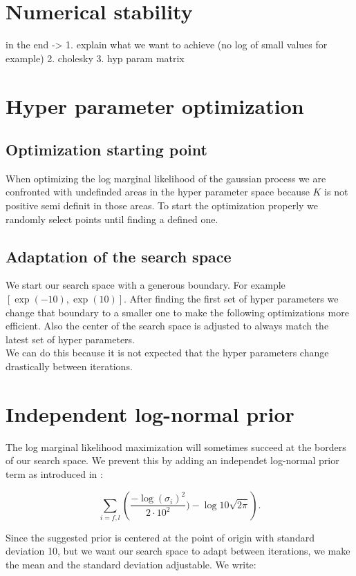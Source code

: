 \section{Numerical stability}
in the end -> 1. explain what we want to achieve (no log of small values for example)
2. cholesky
3. hyp param matrix

\section{Hyper parameter optimization}

\subsection{Optimization starting point}
When optimizing the log marginal likelihood of the gaussian process we are confronted with undefinded areas in the hyper parameter space because $K$ is not positive semi definit in those areas. To start the optimization properly we randomly select points until finding a defined one.

\subsection{Adaptation of the search space}
We start our search space with a generous boundary. For example $[\exp(-10),\exp(10)]$. After finding the first set of hyper parameters we change that boundary to a smaller one to make the following optimizations more efficient. Also the center of the search space is adjusted to always match the latest set of hyper parameters.\\
We can do this because it is not expected that the hyper parameters change drastically between iterations.

\section{Independent log-normal prior}
The log marginal likelihood maximization will sometimes succeed at the borders of our search space. We prevent this by adding an independet log-normal prior term as introduced in \cite{lizotte2008practical}:

$$\sum_{i=f,l}\left(\frac{-\log(\sigma_i)^2}{2\cdot 10^2}) - \log 10\sqrt{2\pi} \right).$$

Since the suggested prior is centered at the point of origin with standard deviation 10, but we want our search space to adapt between iterations, we make the mean and the standard deviation adjustable. We write:

